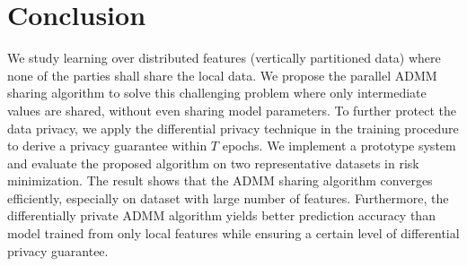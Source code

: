\section{Conclusion}

We study learning over distributed features (vertically partitioned data) where none of the parties shall share the local data. %
We propose the parallel ADMM sharing algorithm to solve this challenging problem where only intermediate values are shared, without even sharing model parameters. To further protect the data privacy, we apply the differential privacy technique in the training procedure to derive a privacy guarantee within $T$ epochs. 
We implement a prototype system and evaluate the proposed algorithm on two representative datasets in risk minimization. The result shows that the ADMM sharing algorithm converges efficiently, especially on dataset with large number of features. Furthermore, the differentially private ADMM algorithm yields better prediction accuracy than model trained from only local features while ensuring a certain level of differential privacy guarantee. 